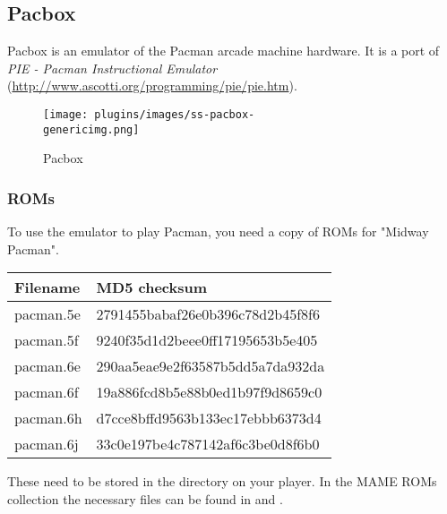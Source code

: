 \subsection{Pacbox}
Pacbox is an emulator of the Pacman arcade machine hardware. It is a port of \emph{PIE - Pacman Instructional Emulator} (\url{http://www.ascotti.org/programming/pie/pie.htm}).
\begin{figure}[h!]
  \begin{center}
    \texttt{[image: plugins/images/ss-pacbox-\\genericimg.png]}
  \end{center}
  \caption{Pacbox}
\end{figure}

\subsubsection{ROMs}
To use the emulator to play Pacman, you need a copy of ROMs for "Midway Pacman".
\begin{center}
  \begin{tabular}{ll}\toprule
    \textbf{Filename} & \textbf{MD5 checksum}\\\midrule
    pacman.5e & 2791455babaf26e0b396c78d2b45f8f6\\
    pacman.5f & 9240f35d1d2beee0ff17195653b5e405\\
    pacman.6e & 290aa5eae9e2f63587b5dd5a7da932da\\
    pacman.6f & 19a886fcd8b5e88b0ed1b97f9d8659c0\\
    pacman.6h & d7cce8bffd9563b133ec17ebbb6373d4\\
    pacman.6j & 33c0e197be4c787142af6c3be0d8f6b0\\\bottomrule
  \end{tabular}
\end{center}

These need to be stored in the  directory on your player.
In the MAME ROMs collection the necessary files can be found in  and .

